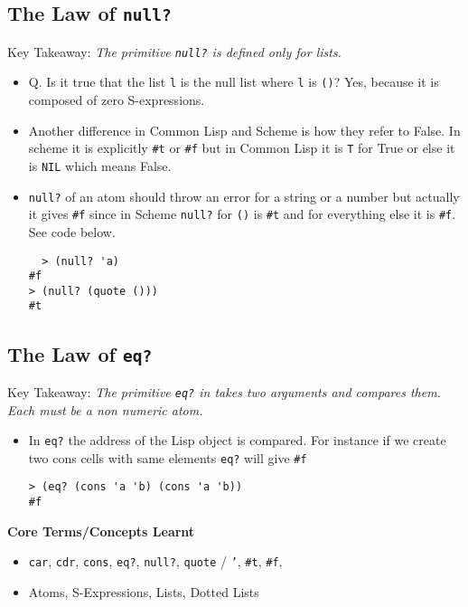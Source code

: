 \documentclass[11pt]{article}
\begin{document}
\subsection{The Law of \texttt{null?}}
\label{sec:orgdf3c65f}
Key Takeaway:
\emph{The primitive \texttt{null?} is defined only for lists.}

\vspace{1em}

\begin{itemize}
\item Q. Is it true that the list \texttt{l} is the null list where \texttt{l} is \texttt{()}? Yes, because it is  composed of
zero S-expressions.
\item Another difference in Common Lisp and Scheme is how they refer to False. In scheme it is explicitly \texttt{\#t} or \texttt{\#f} but
in Common Lisp it is \texttt{T} for True or else it is \texttt{NIL} which means False.
\item \texttt{null?} of an atom should throw an error for a string or a number but actually it gives \texttt{\#f} since in Scheme \texttt{null?}
for \texttt{()} is \texttt{\#t} and for everything else it is \texttt{\#f}. See code below.
\begin{verbatim}
  > (null? 'a)
#f
> (null? (quote ()))
#t

\end{verbatim}
\end{itemize}

\subsection{The Law of \texttt{eq?}}
\label{sec:org6d31b9d}
Key Takeaway:
\emph{The primitive \texttt{eq?} in takes two arguments and compares them. Each must be a non numeric atom.}

\vspace{1em}

\begin{itemize}
\item In \texttt{eq?} the address of the Lisp object is compared. For instance if we create two cons cells with same elements
\texttt{eq?} will give \texttt{\#f}
\begin{verbatim}
> (eq? (cons 'a 'b) (cons 'a 'b))
#f

\end{verbatim}
\end{itemize}

\textbf{Core Terms/Concepts Learnt}
\begin{itemize}
\item \texttt{car}, \texttt{cdr}, \texttt{cons}, \texttt{eq?}, \texttt{null?}, \texttt{quote} / \texttt{'}, \texttt{\#t}, \texttt{\#f},
\item Atoms, S-Expressions, Lists, Dotted Lists
\end{itemize}
\end{document}
